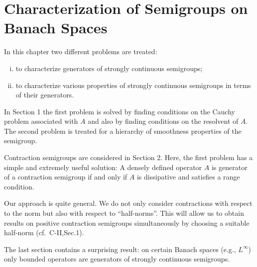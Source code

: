 
\chapter{Characterization of Semigroups on Banach Spaces}

In this chapter two different problems are treated:

\begin{enumerate}[(i)]
\item 
to characterize generators of strongly continuous semigroups;
\item 
to characterize various properties of strongly continuous semigroups in terms of their generators.
\end{enumerate}

In Section 1 the first problem is solved by finding conditions on the Cauchy problem associated with $A$ and also by finding conditions on the resolvent of $A$.
The second problem is treated for a hierarchy of smoothness properties of the semigroup.

Contraction semigroups are considered in Section 2.
Here, the first problem has a simple and extremely useful solution: A densely defined operator $A$ is generator of a contraction semigroup if and only if $A$ is dissipative and satisfies a range condition.

Our approach is quite general.
We do not only consider contractions with respect to the norm but also with respect to \enquote{half-norms}.
This will allow us to obtain results on positive contraction semigroups simultaneously by choosing a suitable half-norm (cf.\ C-II,Sec.1).

The last section contains a surprising result: on certain Banach spaces (e.g., $L^{\infty}$) only bounded operators are generators of strongly continuous semigroups.